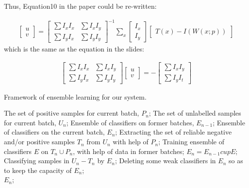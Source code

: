 \documentclass{article}
\begin{document}
Thus, Equation10 in the paper could be re-written:

\begin{equation}
\begin{aligned}
 \begin{bmatrix}u\\v \end{bmatrix}= \begin{bmatrix} \sum I_x I_x & \sum I_x I_y\\  \sum I_y I_x & \sum I_y I_y\end{bmatrix}^{-1}\sum_x \begin{bmatrix}I_x \\ I_y\end{bmatrix} \begin{bmatrix}T(x)-I(W(x;p))\end{bmatrix}
\end{aligned}
\end{equation}
which is the same as the equation in the slides:

\begin{equation}
\begin{aligned}
\begin{bmatrix} \sum I_x I_x & \sum I_x I_y\\  \sum I_y I_x & \sum I_y I_y\end{bmatrix} \begin{bmatrix}u\\v \end{bmatrix}= -\begin{bmatrix}\sum I_xI_y \\ \sum I_yI_t\end{bmatrix}
\end{aligned}
\end{equation}

  \begin{algorithm}[htb]
  \caption{ Framework of ensemble learning for our system.}
  \label{alg:Framwork}
  \begin{algorithmic}[1]
    \Require
      The set of positive samples for current batch, $P_n$;
      The set of unlabelled samples for current batch, $U_n$;
      Ensemble of classifiers on former batches, $E_{n-1}$;
    \Ensure
      Ensemble of classifiers on the current batch, $E_n$;
    \State Extracting the set of reliable negative and/or positive samples $T_n$ from $U_n$ with help of $P_n$;
    \label{code:fram:extract}
    \State Training ensemble of classifiers $E$ on $T_n \cup P_n$, with help of data in former batches;
    \label{code:fram:trainbase}
    \State $E_n=E_{n-1}cup E$;
    \label{code:fram:add}
    \State Classifying samples in $U_n-T_n$ by $E_n$;
    \label{code:fram:classify}
    \State Deleting some weak classifiers in $E_n$ so as to keep the capacity of $E_n$;
    \label{code:fram:select} \\
    \Return $E_n$;
  \end{algorithmic}
\end{algorithm}
\end{document}
